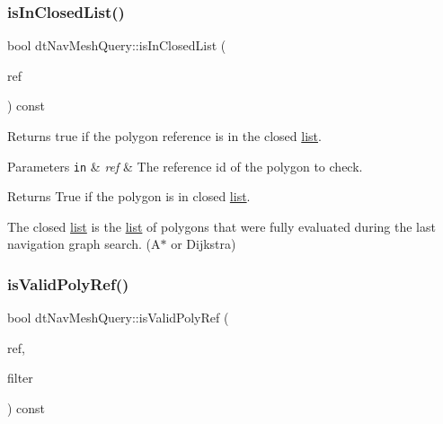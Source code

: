 \subsubsection{\texorpdfstring{is\+In\+Closed\+List()}{isInClosedList()}\hspace{0.1cm}{\footnotesize\ttfamily [2/2]}}
{\footnotesize\ttfamily bool dt\+Nav\+Mesh\+Query\+::is\+In\+Closed\+List (\begin{DoxyParamCaption}\item[{\hyperlink{group__detour_gab4e0b2257a670c1a800057999612b466}{dt\+Poly\+Ref}}]{ref }\end{DoxyParamCaption}) const}

Returns true if the polygon reference is in the closed \hyperlink{protocollist-p}{list}. 
\begin{DoxyParams}[1]{Parameters}
\mbox{\tt in}  & {\em ref} & The reference id of the polygon to check. \\
\hline
\end{DoxyParams}
\begin{DoxyReturn}{Returns}
True if the polygon is in closed \hyperlink{protocollist-p}{list}.
\end{DoxyReturn}
\begin{DoxyParagraph}{}

\end{DoxyParagraph}
The closed \hyperlink{protocollist-p}{list} is the \hyperlink{protocollist-p}{list} of polygons that were fully evaluated during the last navigation graph search. (A$\ast$ or Dijkstra) \mbox{\label{classdtNavMeshQuery_ac76164ed97fdedd9ea8abbe52f6c2c8a}} 
\subsubsection{\texorpdfstring{is\+Valid\+Poly\+Ref()}{isValidPolyRef()}\hspace{0.1cm}{\footnotesize\ttfamily [1/2]}}
{\footnotesize\ttfamily bool dt\+Nav\+Mesh\+Query\+::is\+Valid\+Poly\+Ref (\begin{DoxyParamCaption}\item[{\hyperlink{group__detour_gab4e0b2257a670c1a800057999612b466}{dt\+Poly\+Ref}}]{ref,  }\item[{const \hyperlink{classdtQueryFilter}{dt\+Query\+Filter} $\ast$}]{filter }\end{DoxyParamCaption}) const}

